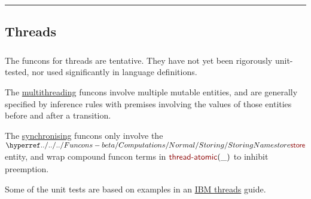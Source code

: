 

\begin{center}
\rule{3in}{0.4pt}
\end{center}

\subsection{Threads}\hypertarget{threads}{}\label{threads}

\begin{align*}
  [ \
  \textsf{Multithreading
          } \ & \textsf{} \\
  \textsf{Synchronising
          } \ & \textsf{} \\
  \textsf{Locks
          } \ & \textsf{} \\
  \textsf{Notifications
          } \ & \textsf{}
  \ ]
\end{align*}
The funcons for threads are tentative. They have not yet been rigorously
unit-tested, nor used significantly in language definitions.

The \href{Multithreading}{multithreading} funcons involve multiple mutable entities, and are
generally specified by inference rules with premises involving the values of
those entities before and after a transition.

The \href{Synchronising}{synchronising} funcons only involve the $\SHADE{\NAMEHYPER{../../../Funcons-beta/Computations/Normal}{Storing}{store}}$ entity, and wrap
compound funcon terms in $\SHADE{\NAME{thread-atomic}
           (  \_ )}$ to inhibit preemption.

Some of the unit tests are based on examples in an \href{https://www.ibm.com/support/knowledgecenter/ssw_aix_72/com.ibm.aix.genprogc/chapter12.htm}{IBM threads} guide.



